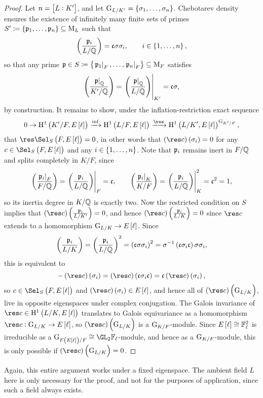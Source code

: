 \begin{proof}
Let $ n = \sbr{L : K'} $, and let $ \G_{L / K'} = \cbr{\sigma_1, \dots, \sigma_n} $. Chebotarev density ensures the existence of infinitely many finite sets of primes $ S' \coloneqq \cbr{\ppp_1, \dots, \ppp_n} \subseteq \M_L $ such that
$$ \br{\dfrac{\ppp_i}{L / \QQ}} = \ccc\sigma\sigma_i, \qquad i \in \cbr{1, \dots, n}, $$
so that any prime $ \ppp \in S \coloneqq \cbr{\eval{\ppp_1}_F, \dots, \eval{\ppp_n}_F} \subseteq \M_F $ satisfies
$$ \br{\dfrac{\eval{\ppp}_\QQ}{K' / \QQ}} = \eval{\br{\dfrac{\eval{\ppp}_\QQ}{L / \QQ}}}_{K'} = \ccc\sigma, $$
by construction. It remains to show, under the inflation-restriction exact sequence
$$ 0 \to \H^1\br{K' / F, E\sbr{\ell}} \xrightarrow{\inf} \H^1\br{L / F, E\sbr{\ell}} \xrightarrow{\res} \H^1\br{L / K', E\sbr{\ell}}^{\G_{K' / F}}, $$
that $ \res \Sel_S\br{F, E\sbr{\ell}} = 0 $, in other words that $ \br{\res c}\br{\sigma_i} = 0 $ for any $ c \in \Sel_S\br{F, E\sbr{\ell}} $ and any $ i \in \cbr{1, \dots, n} $. Note that $ \mathfrak{p}_i $ remains inert in $ F / \mathbb{Q} $ and splits completely in $ K / F $, since
$$ \br{\dfrac{\eval{\ppp_i}_F}{F / \QQ}} = \eval{\br{\dfrac{\ppp_i}{L / \QQ}}}_F = \ccc, \qquad \br{\dfrac{\eval{\ppp_i}_K}{K / F}} = \eval{\br{\dfrac{\ppp_i}{L / \QQ}}}_K^2 = \ccc^2 = 1, $$
so its inertia degree in $ K / \mathbb{Q} $ is exactly two. Now the restricted condition on $ S $ implies that $ \br{\res c}\br{\tfrac{\ppp_i}{L / K'}} = 0 $, and hence $ \br{\res c}\br{\tfrac{\ppp_i}{L / K}} = 0 $ since $ \res c $ extends to a homomorphism $ \G_{L / K} \to E\sbr{\ell} $. Since
$$ \br{\dfrac{\ppp_i}{L / K}} = \br{\dfrac{\ppp_i}{L / \QQ}}^2 = \br{\ccc\sigma\sigma_i}^2 = \sigma^{-1}\br{\ccc\sigma_i\ccc}\sigma\sigma_i, $$
this is equivalent to
$$ -\br{\res c}\br{\sigma_i} = \br{\res c}\br{\ccc\sigma_i\ccc} = \ccc\br{\res c}\br{\sigma_i}, $$
so $ c \in \Sel_S\br{F, E\sbr{\ell}} $ and $ \br{\res c}\br{\sigma_i} \in E\sbr{\ell} $, and hence all of $ \br{\res c}\br{\G_{L / K}} $, live in opposite eigenspaces under complex conjugation. The Galois invariance of $ \res c \in \H^1\br{L / K, E\sbr{\ell}} $ translates to Galois equivariance as a homomorphism $ \res c : \G_{L / K} \to E\sbr{\ell} $, so $ \br{\res c}\br{\G_{L / K}} $ is a $ \mathrm{G}_{K / F} $-module. Since $ E\sbr{\ell} \cong \FF_\ell^2 $ is irreducible as a $ \G_{F\br{E\sbr{\ell}} / F} \cong \GL_2 \FF_\ell $-module, and hence as a $ \mathrm{G}_{K / F} $-module, this is only possible if $ \br{\res c}\br{\G_{L / K}} = 0 $.
\end{proof}

Again, this entire argument works under a fixed eigenspace. The ambient field $ L $ here is only necessary for the proof, and not for the purposes of application, since such a field always exists.

